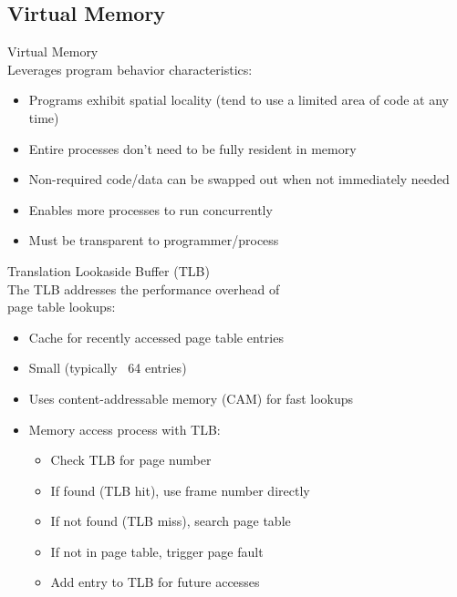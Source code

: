 \columnbreak

\subsection{Virtual Memory}



\begin{definition}{Virtual Memory}\\
    Leverages program behavior characteristics:
    \begin{itemize}
        \item Programs exhibit spatial locality (tend to use a limited area of code at any time)
        \item Entire processes don't need to be fully resident in memory
        \item Non-required code/data can be swapped out when not immediately needed
        \item Enables more processes to run concurrently
        \item Must be transparent to programmer/process
    \end{itemize}
\end{definition}


\begin{theorem}{Translation Lookaside Buffer (TLB)}\\
    The TLB addresses the performance overhead of \\ page table lookups:
    \begin{itemize}
        \item Cache for recently accessed page table entries
        \item Small (typically ~64 entries)
        \item Uses content-addressable memory (CAM) for fast lookups
        \item Memory access process with TLB:
            \begin{itemize}
                \item Check TLB for page number
                \item If found (TLB hit), use frame number directly
                \item If not found (TLB miss), search page table
                \item If not in page table, trigger page fault
                \item Add entry to TLB for future accesses
            \end{itemize}
    \end{itemize}
\end{theorem}

